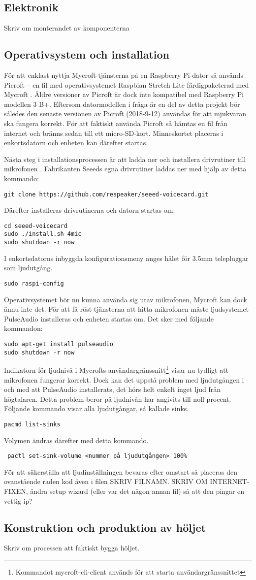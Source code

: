 \subsection{Elektronik}
Skriv om monterandet av komponenterna
\subsection{Operativsystem och installation}
För att enklast nyttja Mycroft-tjänsterna på en Raspberry Pi-dator så används Picroft – en fil med operativsystemet Raspbian Stretch Lite färdigpaketerad med Mycroft \cite{picroft}. Äldre versioner av Picroft är dock inte kompatibel med Raspberry Pi modellen 3 B+.  Eftersom datormodellen i fråga är en del av detta projekt bör således den senaste versionen av Picroft (2018-9-12) användas för att mjukvaran ska fungera korrekt. För att faktiskt använda Picroft så hämtas en fil från internet och bränns sedan till ett micro-SD-kort. Minneskortet placeras i enkortsdatorn och enheten kan därefter startas.

Nästa steg i installationsprocessen är att ladda ner och installera drivrutiner till mikrofonen \cite{seeeds_documentation, reaspeker-installation}. Fabrikanten Seeeds egna drivrutiner laddas ner med hjälp av detta kommando:
\begin{verbatim}
git clone https://github.com/respeaker/seeed-voicecard.git
\end{verbatim}
Därefter installeras drivrutinerna och datorn startas om.
\begin{verbatim}
cd seeed-voicecard
sudo ./install.sh 4mic
sudo shutdown -r now
\end{verbatim}
I enkortsdatorns inbyggda konfigurationsmeny anges hålet för 3.5mm telepluggar som ljudutgång. 
\begin{verbatim}
sudo raspi-config
\end{verbatim}
Operativsystemet bör nu kunna använda sig utav mikrofonen, Mycroft kan dock ännu inte det. För att få röst-tjänsterna att hitta mikrofonen måste ljudsystemet PulseAudio installeras och enheten startas om. Det sker med följande kommandon:
\begin{verbatim}
sudo apt-get install pulseaudio
sudo shutdown -r now
\end{verbatim}
Indikatorn för ljudnivå i Mycrofts användargränssnitt\footnote{Kommandot mycroft-cli-client används för att starta användargränssnittet} visar nu tydligt att mikrofonen fungerar korrekt. Dock kan det uppstå problem med ljudutgången i och med att PulseAudio installerats, det hörs helt enkelt inget ljud från högtalaren. Detta problem beror på ljudnivån har angivits till noll procent. Följande kommando visar alla ljudutgångar, så kallade sinks.
\begin{verbatim}
pacmd list-sinks
\end{verbatim}
Volymen ändras därefter med detta kommando.
 \begin{verbatim}
 pactl set-sink-volume <nummer på ljudutgången> 100%
 \end{verbatim}
 För att säkerställa att ljudinställningen bevaras efter omstart så placeras den ovanstående raden kod även i filen SKRIV FILNAMN.
SKRIV OM INTERNET-FIXEN, ändra setup wizard (eller var det någon annan fil) så att den pingar en vettig ip?
\subsection{Konstruktion och produktion av höljet}
Skriv om processen att faktiskt bygga höljet.
